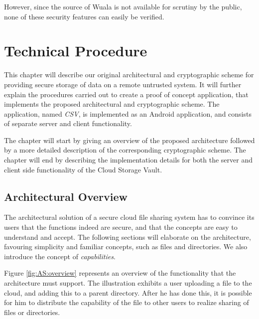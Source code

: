 \documentclass[pdftex,english,10pt,b5paper,twoside]{book}
\begin{document}
However, since the source of Wuala is not available for scrutiny by the public, none of
these security features can easily be verified.



\chapter{Technical Procedure}
\label{ch:technical}

This chapter will describe our original architectural and cryptographic
scheme for providing secure storage of data on a remote untrusted system. It will
further explain the procedures carried out to create a proof of concept
application, that implements the proposed architectural and cryptographic
scheme. The application, named \emph{\ac{CSV}}, is implemented as an
Android application, and consists of separate server and client functionality.

The chapter will start by giving an overview of the proposed architecture
followed by a more detailed description of the corresponding cryptographic
scheme. The chapter will end by describing the implementation details for both
the server and client side functionality of the Cloud Storage Vault.

\section{Architectural Overview}
\label{chap:AS}

The architectural solution of a secure cloud file sharing system has to
convince its users that the functions indeed are secure, and that the concepts
are easy to understand and accept. The following sections will elaborate on the
architecture, favouring simplicity and familiar concepts, such as files and
directories. We also introduce the concept of \emph{capabilities}.

Figure \ref{fig:AS:overview} represents an overview of the functionality that
the architecture must support. The illustration exhibits a user uploading a
file to the cloud, and adding this to a parent directory. After he has done
this, it is possible for him to distribute the capability of the file to other
users to realize sharing of files or directories.
\end{document}
